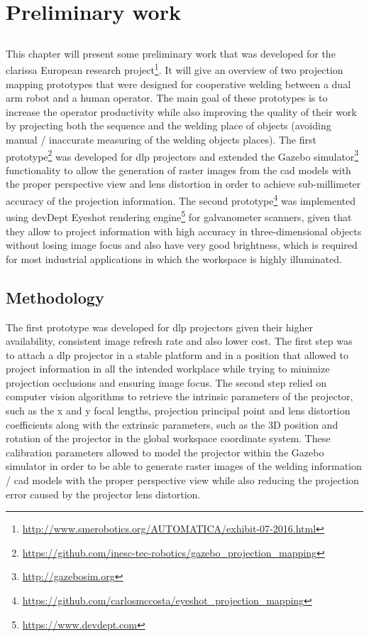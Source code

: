 \chapter{Preliminary work}\label{chap:preliminary-work}

\section*{}

This chapter will present some preliminary work that was developed for the \gls{clarissa} European research project\footnote{\url{http://www.smerobotics.org/AUTOMATICA/exhibit-07-2016.html}}. It will give an overview of two projection mapping prototypes that were designed for cooperative welding between a dual arm robot and a human operator. The main goal of these prototypes is to increase the operator productivity while also improving the quality of their work by projecting both the sequence and the welding place of objects (avoiding manual / inaccurate measuring of the welding objects places). The first prototype\footnote{\url{https://github.com/inesc-tec-robotics/gazebo_projection_mapping}} was developed for \gls{dlp} projectors and extended the Gazebo simulator\footnote{\url{http://gazebosim.org}} functionality to allow the generation of raster images from the \gls{cad} models with the proper perspective view and lens distortion in order to achieve sub-millimeter accuracy of the projection information. The second prototype\footnote{\url{https://github.com/carlosmccosta/eyeshot_projection_mapping}} was implemented using devDept Eyeshot rendering engine\footnote{\url{https://www.devdept.com}} for galvanometer scanners, given that they allow to project information with high accuracy in three-dimensional objects without losing image focus and also have very good brightness, which is required for most industrial applications in which the workspace is highly illuminated.


\section{Methodology}

The first prototype was developed for \gls{dlp} projectors given their higher availability, consistent image refresh rate and also lower cost. The first step was to attach a \gls{dlp} projector in a stable platform and in a position that allowed to project information in all the intended workplace while trying to minimize projection occlusions and ensuring image focus. The second step relied on computer vision algorithms to retrieve the intrinsic parameters of the projector, such as the x and y focal lengths, projection principal point and lens distortion coefficients along with the extrinsic parameters, such as the 3D position and rotation of the projector in the global workspace coordinate system. These calibration parameters allowed to model the projector within the Gazebo simulator in order to be able to generate raster images of the welding information / \gls{cad} models with the proper perspective view while also reducing the projection error caused by the projector lens distortion.

